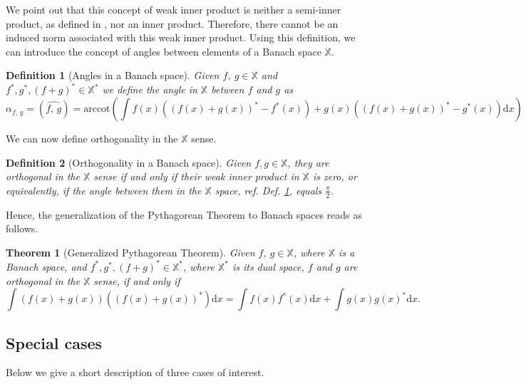 \documentclass{article}
\def\dx{{\textrm{d}x}}
\newtheorem{theorem}{Theorem}
\newtheorem{definition}{Definition}
\begin{document}
We point out that this concept of weak inner product is neither a semi-inner product, as defined in \cite{lumer1961semi}, nor an inner product. Therefore, there cannot be an induced norm associated with this weak inner product. Using this definition, we can introduce the concept of angles between elements of a Banach space $\mathbb{X}$.

\begin{definition}[Angles in a Banach space]\label{def:angle_X} %
Given $f,\ g\in \mathbb{X}$ and $f^*, g^*, (f+g)^* \in\mathbb{X}^*$ we define the angle in $ \mathbb{X}$ between $f$ and $g$ as
\begin{equation}\label{eq:angle_X}
	\alpha_{f,\,g}=(\widehat{f,\, g})=\textrm{arccot}\left( \int f(x)\left((f(x)+g(x))^*-f^*(x)\right)+g(x)\left((f(x)+g(x))^*-g^*(x)\right) \dx\right)
\end{equation}
\end{definition}

We can now define orthogonality in the $\mathbb{X}$ sense.
\begin{definition}[Orthogonality in a Banach space]\label{def:orth_X} %
Given $f,g\in \mathbb{X}$, they are orthogonal in the $\mathbb{X}$ sense if and only if their weak inner product in $\mathbb{X}$ is zero, or equivalently, if the angle between them in the $\mathbb{X}$ space, ref. Def. \ref{def:angle_X},  equals $\frac{\pi}{2}$.
\end{definition}

Hence, the generalization of the Pythagorean Theorem to Banach spaces reads as follows.
\begin{theorem}[Generalized Pythagorean Theorem]\label{thm:pytha_X} %
Given $f,\ g\in \mathbb{X}$, where $\mathbb{X}$ is a Banach space, and $f^*, g^*, (f+g)^* \in\mathbb{X}^*$, where $\mathbb{X}^*$ is its dual space, $f$ and $g$ are orthogonal in the $ \mathbb{X}$ sense, if and only if
\begin{equation}\label{eq:pytha_X}
	\int \left(f(x)+g(x)\right)\left((f(x)+g(x))^*\right) \dx = \int f(x)f^*(x) \dx +\int g(x)g(x)^* \dx.
\end{equation}
\end{theorem}

\subsection{Special cases}

Below we give a short description of three cases of interest.
\end{document}
